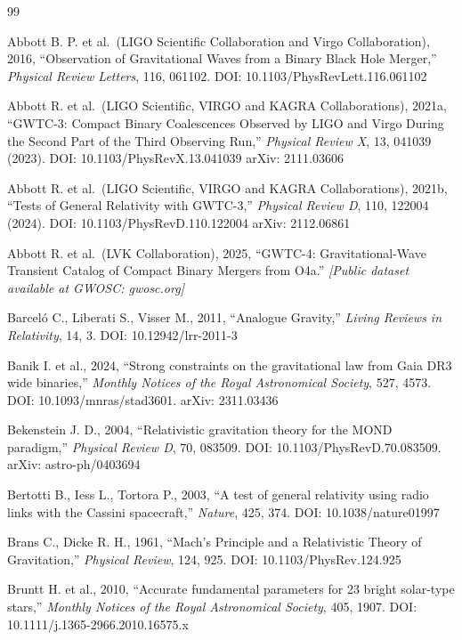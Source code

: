 \documentclass[11pt,a4paper]{article}
\begin{document}
\hypertarget{bibliography}{%

\begin{thebibliography}{99}

Abbott B. P. et al.~(LIGO Scientific Collaboration and Virgo Collaboration), 2016, ``Observation of Gravitational Waves from a Binary Black Hole Merger,'' \emph{Physical Review Letters}, 116, 061102. DOI: 10.1103/PhysRevLett.116.061102

Abbott R. et al.~(LIGO Scientific, VIRGO and KAGRA Collaborations), 2021a, ``GWTC-3: Compact Binary Coalescences Observed by LIGO and Virgo During the Second Part of the Third Observing Run,'' \emph{Physical Review X}, 13, 041039 (2023). DOI: 10.1103/PhysRevX.13.041039 arXiv: 2111.03606

Abbott R. et al.~(LIGO Scientific, VIRGO and KAGRA Collaborations), 2021b, ``Tests of General Relativity with GWTC-3,'' \emph{Physical Review D}, 110, 122004 (2024). DOI: 10.1103/PhysRevD.110.122004 arXiv: 2112.06861

Abbott R. et al.~(LVK Collaboration), 2025, ``GWTC-4: Gravitational-Wave Transient Catalog of Compact Binary Mergers from O4a.'' \emph{{[}Public dataset available at GWOSC: gwosc.org{]}}

Barceló C., Liberati S., Visser M., 2011, ``Analogue Gravity,'' \emph{Living Reviews in Relativity}, 14, 3. DOI: 10.12942/lrr-2011-3

Banik I. et al., 2024, ``Strong constraints on the gravitational law from Gaia DR3 wide binaries,'' \emph{Monthly Notices of the Royal Astronomical Society}, 527, 4573. DOI: 10.1093/mnras/stad3601. arXiv: 2311.03436

Bekenstein J. D., 2004, ``Relativistic gravitation theory for the MOND paradigm,'' \emph{Physical Review D}, 70, 083509. DOI: 10.1103/PhysRevD.70.083509. arXiv: astro-ph/0403694

Bertotti B., Iess L., Tortora P., 2003, ``A test of general relativity using radio links with the Cassini spacecraft,'' \emph{Nature}, 425, 374. DOI: 10.1038/nature01997

Brans C., Dicke R. H., 1961, ``Mach's Principle and a Relativistic Theory of Gravitation,'' \emph{Physical Review}, 124, 925. DOI: 10.1103/PhysRev.124.925

Bruntt H. et al., 2010, ``Accurate fundamental parameters for 23 bright solar-type stars,'' \emph{Monthly Notices of the Royal Astronomical Society}, 405, 1907. DOI: 10.1111/j.1365-2966.2010.16575.x


\end{thebibliography}}
\end{document}
